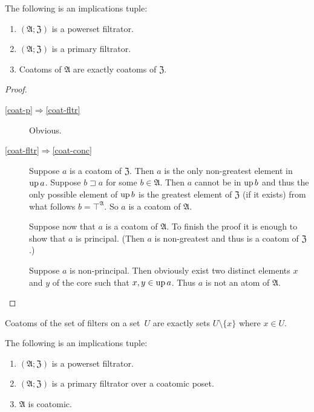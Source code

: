 \begin{prop}
\label{coat}The following is an implications tuple:
\begin{enumerate}
\item \label{coat-p}$(\mathfrak{A};\mathfrak{Z})$ is a powerset filtrator.
\item \label{coat-fltr}$(\mathfrak{A};\mathfrak{Z})$ is a primary filtrator.
\item \label{coat-conc}Coatoms of $\mathfrak{A}$ are exactly coatoms of
$\mathfrak{Z}$.
\end{enumerate}
\end{prop}
\begin{proof}
~
\begin{description}
\item [{\ref{coat-p}$\Rightarrow$\ref{coat-fltr}}] Obvious.
\item [{\ref{coat-fltr}$\Rightarrow$\ref{coat-conc}}] Suppose $a$ is
a coatom of $\mathfrak{Z}$. Then $a$ is the only non-greatest element
in $\operatorname{up} a$. Suppose $b\sqsupset a$ for some $b\in\mathfrak{A}$.
Then $a$ cannot be in $\operatorname{up} b$ and thus the only possible element
of $\operatorname{up} b$ is the greatest element of $\mathfrak{Z}$ (if it exists)
from what follows $b=\top^{\mathfrak{A}}$. So $a$ is a coatom of
$\mathfrak{A}$.


Suppose now that $a$ is a coatom of $\mathfrak{A}$. To finish the
proof it is enough to show that $a$ is principal. (Then $a$ is non-greatest
and thus is a coatom of $\mathfrak{Z}$.)


Suppose $a$ is non-principal. Then obviously exist two distinct elements
$x$ and $y$ of the core such that $x,y\in\operatorname{up} a$. Thus $a$ is not
an atom of $\mathfrak{A}$.

\end{description}
\end{proof}
\begin{cor}
Coatoms of the set of filters on a set~$U$ are exactly sets $U\setminus\{x\}$
where $x\in U$.\end{cor}
\begin{prop}
\label{coat-ic}The following is an implications tuple:
\begin{enumerate}
\item \label{coat-ic-p}$(\mathfrak{A};\mathfrak{Z})$ is a powerset filtrator.
\item \label{coat-ic-fltr}$(\mathfrak{A};\mathfrak{Z})$ is a primary filtrator
over a coatomic poset.
\item \label{coat-ic-conc}$\mathfrak{A}$ is coatomic.
\end{enumerate}
\end{prop}
